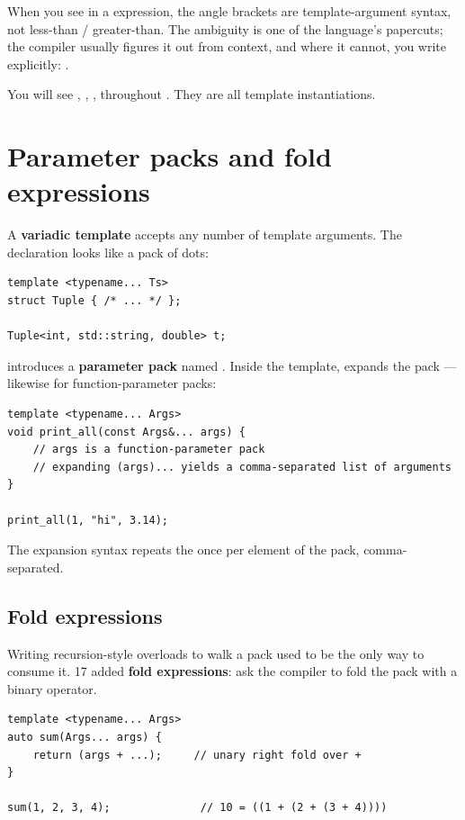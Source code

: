 When you see  in a \cpp{} expression, the angle
brackets are template-argument syntax, not less-than / greater-than.
The ambiguity is one of the language's papercuts; the compiler
usually figures it out from context, and where it cannot, you write
 explicitly: .

You will see , , ,
 throughout \maya{}. They are all template
instantiations.

\section{Parameter packs and fold expressions}
\label{sec:cpp:packs}

A \textbf{variadic template} accepts any number of template arguments.
The declaration looks like a pack of dots:

\begin{lstlisting}
template <typename... Ts>
struct Tuple { /* ... */ };

Tuple<int, std::string, double> t;
\end{lstlisting}

 introduces a \textbf{parameter pack} named
. Inside the template,  expands the pack ---
likewise for function-parameter packs:

\begin{lstlisting}
template <typename... Args>
void print_all(const Args&... args) {
    // args is a function-parameter pack
    // expanding (args)... yields a comma-separated list of arguments
}

print_all(1, "hi", 3.14);
\end{lstlisting}

The expansion syntax  repeats the 
once per element of the pack, comma-separated.

\subsection{Fold expressions}

Writing recursion-style overloads to walk a pack used to be the only
way to consume it. \cpp{}17 added \textbf{fold expressions}: ask the
compiler to fold the pack with a binary operator.

\begin{lstlisting}
template <typename... Args>
auto sum(Args... args) {
    return (args + ...);     // unary right fold over +
}

sum(1, 2, 3, 4);              // 10 = ((1 + (2 + (3 + 4))))
\end{lstlisting}

